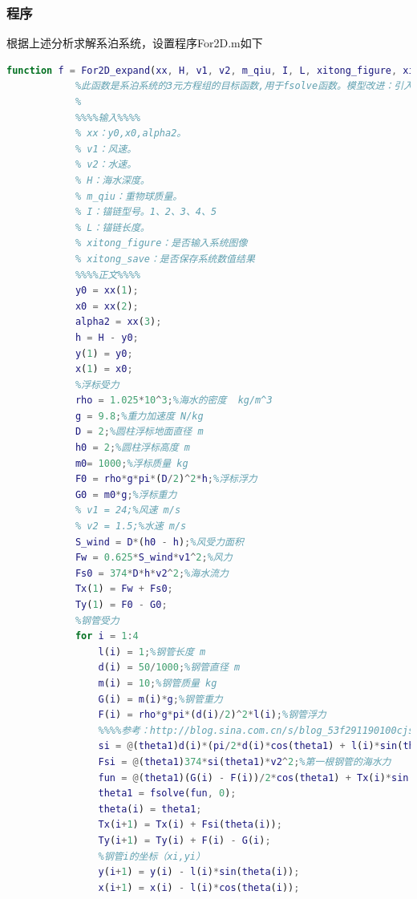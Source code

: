 \documentclass[UTF8]{ctexbook}
\theoremstyle{nonumberplain}
\begin{document}
        \subsubsection{程序}
            \par
            根据上述分析求解系泊系统，设置程序For2D.m如下
            \begin{lstlisting}[language = Matlab]
            function f = For2D_expand(xx, H, v1, v2, m_qiu, I, L, xitong_figure, xitong_save)
            %此函数是系泊系统的3元方程组的目标函数,用于fsolve函数。模型改进：引入"力矩平衡"和"悬链线方程"
            %
            %%%%输入%%%%
            % xx：y0,x0,alpha2。
            % v1：风速。
            % v2：水速。
            % H：海水深度。
            % m_qiu：重物球质量。
            % I：锚链型号。1、2、3、4、5
            % L：锚链长度。
            % xitong_figure：是否输入系统图像
            % xitong_save：是否保存系统数值结果
            %%%%正文%%%%
            y0 = xx(1);
            x0 = xx(2);
            alpha2 = xx(3);
            h = H - y0;
            y(1) = y0;
            x(1) = x0;
            %浮标受力
            rho = 1.025*10^3;%海水的密度  kg/m^3
            g = 9.8;%重力加速度 N/kg
            D = 2;%圆柱浮标地面直径 m
            h0 = 2;%圆柱浮标高度 m
            m0= 1000;%浮标质量 kg
            F0 = rho*g*pi*(D/2)^2*h;%浮标浮力
            G0 = m0*g;%浮标重力
            % v1 = 24;%风速 m/s
            % v2 = 1.5;%水速 m/s
            S_wind = D*(h0 - h);%风受力面积
            Fw = 0.625*S_wind*v1^2;%风力
            Fs0 = 374*D*h*v2^2;%海水流力
            Tx(1) = Fw + Fs0;
            Ty(1) = F0 - G0;
            %钢管受力
            for i = 1:4
                l(i) = 1;%钢管长度 m
                d(i) = 50/1000;%钢管直径 m
                m(i) = 10;%钢管质量 kg
                G(i) = m(i)*g;%钢管重力
                F(i) = rho*g*pi*(d(i)/2)^2*l(i);%钢管浮力
                %%%%参考：http://blog.sina.com.cn/s/blog_53f291190100cjss.html
                si = @(theta1)d(i)*(pi/2*d(i)*cos(theta1) + l(i)*sin(theta1));%第一根钢管的海水法平面投影
                Fsi = @(theta1)374*si(theta1)*v2^2;%第一根钢管的海水力
                fun = @(theta1)(G(i) - F(i))/2*cos(theta1) + Tx(i)*sin(theta1) + Fsi(theta1)*sin(theta1)/2 - Ty(i)*cos(theta1);
                theta1 = fsolve(fun, 0);
                theta(i) = theta1;
                Tx(i+1) = Tx(i) + Fsi(theta(i));
                Ty(i+1) = Ty(i) + F(i) - G(i);
                %钢管i的坐标（xi,yi）
                y(i+1) = y(i) - l(i)*sin(theta(i));
                x(i+1) = x(i) - l(i)*cos(theta(i));

\end{lstlisting}
\end{document}
